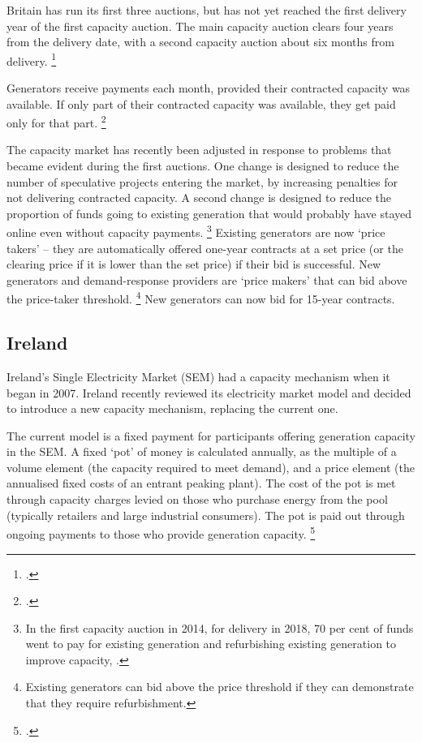\documentclass[FrontPage]{grattan}
\begin{document}
Britain has run its first three auctions, but has not yet reached the first delivery year of the first capacity auction. The main capacity auction clears four years from the delivery date, with a second capacity auction about six months from delivery.%
\footcite{NationalGrid2016AuctionResults}

Generators receive payments each month, provided their contracted capacity was available. If only part of their contracted capacity was available, they get paid only for that part.%
\footcite{Ofgem2016CapacityMarketRules}

The capacity market has recently been adjusted in response to problems that became evident during the first auctions. One change is designed to reduce the number of speculative projects entering the market, by increasing penalties for not delivering contracted capacity. A second change is designed to reduce the proportion of funds going to existing generation that would probably have stayed online even without capacity payments.%
\footnote{In the first capacity auction in 2014, for delivery in 2018, 70 per cent of funds went to pay for existing generation and refurbishing existing generation to improve capacity, \textcite{NationalGrid2014AuctionResults}.}
Existing generators are now `price takers' -- they are automatically offered one-year contracts at a set price (or the clearing price if it is lower than the set price) if their bid is successful. New generators and demand-response providers are `price makers' that can bid above the price-taker threshold.%
\footnote{Existing generators can bid above the price threshold if they can demonstrate that they require refurbishment.}
New generators can now bid for 15-year contracts.

\subsection{Ireland}\label{subsec:appendix-ireland}
Ireland's Single Electricity Market (SEM) had a capacity mechanism when it began in 2007. Ireland recently reviewed its electricity market model and decided to introduce a new capacity mechanism, replacing the current one.

The current model is a fixed payment for participants offering generation capacity in the SEM\@. A fixed `pot' of money is calculated annually, as the multiple of a volume element (the capacity required to meet demand), and a price element (the annualised fixed costs of an entrant peaking plant). The cost of the pot is met through capacity charges levied on those who purchase energy from the pool (typically retailers and large industrial consumers). The pot is paid out through ongoing payments to those who provide generation capacity.%
\footcite{SEM2017CapacityPayment}
\end{document}
